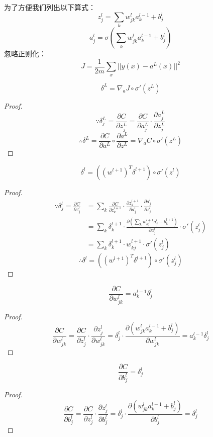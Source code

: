 \documentclass[cn,hazy,blue,normal,14pt]{elegantnote}
\begin{document}
为了方便我们列出以下算式：
$$
z_j^l=\sum_{k}w_{jk}^la_k^{l-1}+b_j^l
$$
$$
a_j^l=\sigma(\sum_{k}w_{jk}^la_k^{l-1}+b_j^l)
$$
忽略正则化：
$$
J=\frac{1}{2m}\sum_x||y(x)-a^L(x)||^2
$$
\begin{lemma}
$$
\delta^L=\nabla_a J \circ \sigma'(z^L)
$$
\end{lemma}
\begin{proof}
$$
\because \delta_j^L=\frac{\partial C}{\partial z_j^L}=\frac{\partial C}{\partial a_j^L}\cdot \frac{\partial a_j^L}{\partial z_j^L} 
$$
$$
\therefore \delta^L=\frac{\partial C}{\partial a^L}\circ \frac{\partial a^L}{\partial z^L}=\nabla_a C \circ \sigma'(z^L)
$$
\end{proof}
\begin{lemma}
$$
\delta^l=((w^{l+1})^T\delta^{l+1})\circ \sigma'(z^l)
$$
\end{lemma}
\begin{proof}
$$
\begin{aligned}\because \delta_j^l=\frac{\partial C}{\partial z_j^l}
    &=\sum_k \frac{\partial C}{\partial z_k^{l+1}}\cdot\frac{\partial z_k^{l+1}}{\partial a_j^l}\cdot \frac{\partial a_j^l}{\partial z_j^l} \\
    &=\sum_k \delta_k^{l+1}\cdot\frac{\partial (\sum\limits_{k}w_{kj}^{l+1}a_j^{l}+b_k^{l+1})}{\partial a_j^l}\cdot \sigma'(z_j^l) \\
    &=\sum_k \delta_k^{l+1}\cdot w_{kj}^{l+1}\cdot \sigma'(z_j^l)
\end{aligned} 
$$
$$
\therefore \delta^l=((w^{l+1})^T\delta^{l+1})\circ \sigma'(z_j^l)
$$
\end{proof}
\begin{lemma}
$$
\frac{\partial C}{\partial w_{jk}^l}=a_k^{l-1}\delta_j^l
$$
\end{lemma}
\begin{proof}
$$
\frac{\partial C}{\partial w_{jk}^l}=\frac{\partial C}{\partial z_j^l}\cdot \frac{\partial z_j^l}{\partial w_{jk}^l}=\delta_j^l \cdot \frac{\partial (w_{jk}^l a_k^{l-1}+b_j^l)}{\partial w_{jk}^l}=a_k^{l-1}\delta_j^l
$$
\end{proof}
\begin{lemma}
$$
\frac{\partial C}{\partial b_j^l}=\delta_j^l
$$
\end{lemma}
\begin{proof}
$$
\frac{\partial C}{\partial b_j^l}=\frac{\partial C}{\partial z_j^l}\cdot \frac{\partial z_j^l}{\partial b_j^l}=\delta_j^l \cdot \frac{\partial (w_{jk}^l a_k^{l-1}+b_j^l)}{\partial b_j^l}=\delta_j^l
$$
\end{proof}
\end{document}

